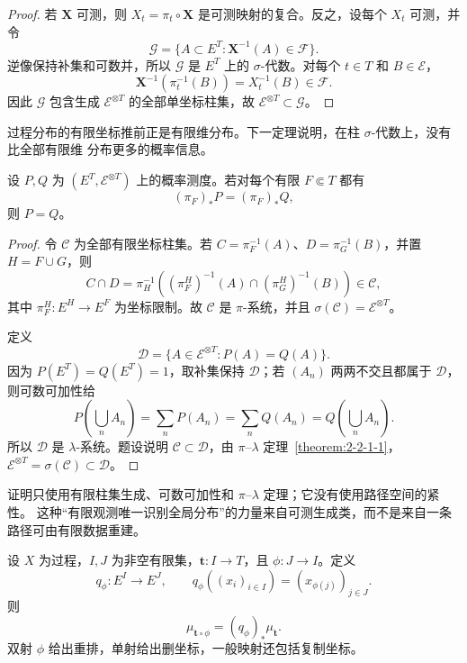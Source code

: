 \begin{proof}
若 $\mathbf X$ 可测，则 $X_t=\pi_t\circ\mathbf X$ 是可测映射的复合。反之，设每个 $X_t$ 可测，并令
\[
  \mathcal G=\{A\subset E^T:\mathbf X^{-1}(A)\in\mathcal F\}.
\]
逆像保持补集和可数并，所以 $\mathcal G$ 是 $E^T$ 上的 $\sigma$-代数。对每个 $t\in T$ 和
$B\in\mathcal E$，
\[
  \mathbf X^{-1}(\pi_t^{-1}(B))=X_t^{-1}(B)\in\mathcal F.
\]
因此 $\mathcal G$ 包含生成 $\mathcal E^{\otimes T}$ 的全部单坐标柱集，故
$\mathcal E^{\otimes T}\subset\mathcal G$。
\end{proof}

过程分布的有限坐标推前正是有限维分布。下一定理说明，在柱 $\sigma$-代数上，没有比全部有限维
分布更多的概率信息。

\begin{theorem}[有限维分布的唯一性]\label{theorem:6-1-1-2}
设 $P,Q$ 为 $(E^T,\mathcal E^{\otimes T})$ 上的概率测度。若对每个有限 $F\Subset T$ 都有
\[
  (\pi_F)_*P=(\pi_F)_*Q,
\]
则 $P=Q$。
\end{theorem}

\begin{proof}
令 $\mathcal C$ 为全部有限坐标柱集。若
$C=\pi_F^{-1}(A)$、$D=\pi_G^{-1}(B)$，并置 $H=F\cup G$，则
\[
 C\cap D
 =\pi_H^{-1}\!\left((\pi_F^H)^{-1}(A)\cap(\pi_G^H)^{-1}(B)\right)\in\mathcal C,
\]
其中 $\pi_F^H:E^H\to E^F$ 为坐标限制。故 $\mathcal C$ 是 $\pi$-系统，并且
$\sigma(\mathcal C)=\mathcal E^{\otimes T}$。

定义
\[
 \mathcal D=\{A\in\mathcal E^{\otimes T}:P(A)=Q(A)\}.
\]
因为 $P(E^T)=Q(E^T)=1$，取补集保持 $\mathcal D$；若 $(A_n)$ 两两不交且都属于
$\mathcal D$，则可数可加性给
\[
 P\!\left(\bigcup_nA_n\right)=\sum_nP(A_n)
 =\sum_nQ(A_n)=Q\!\left(\bigcup_nA_n\right).
\]
所以 $\mathcal D$ 是 $\lambda$-系统。题设说明 $\mathcal C\subset\mathcal D$，由
$\pi$--$\lambda$ 定理~\ref{theorem:2-2-1-1}，
$\mathcal E^{\otimes T}=\sigma(\mathcal C)\subset\mathcal D$。
\end{proof}

证明只使用有限柱集生成、可数可加性和 $\pi$--$\lambda$ 定理；它没有使用路径空间的紧性。
这种“有限观测唯一识别全局分布”的力量来自可测生成类，而不是来自一条路径可由有限数据重建。

\begin{proposition}[有限维分布的相容性]\label{proposition:6-1-1-3}
设 $X$ 为过程，$I,J$ 为非空有限集，$\mathbf t:I\to T$，且 $\phi:J\to I$。定义
\[
 q_\phi:E^I\longrightarrow E^J,
 \qquad q_\phi((x_i)_{i\in I})=(x_{\phi(j)})_{j\in J}.
\]
则
\[
  \mu_{\mathbf t\circ\phi}=(q_\phi)_*\mu_{\mathbf t}.
  \tag{6.1.1}\label{eq:6-1-1-functorial-consistency}
\]
双射 $\phi$ 给出重排，单射给出删坐标，一般映射还包括复制坐标。
\end{proposition}

